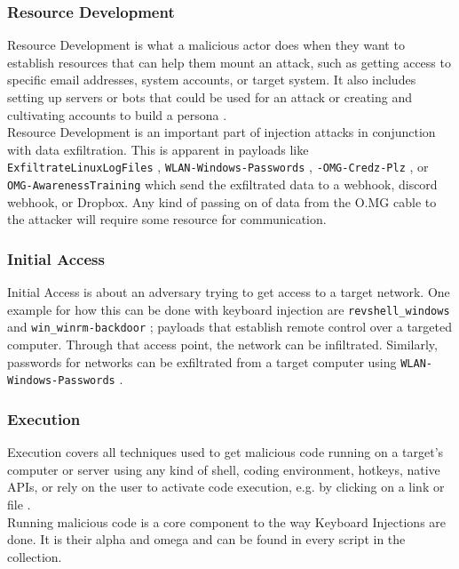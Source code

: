 \subsubsection{Resource Development}

Resource Development is what a malicious actor does when they want to establish resources that can help them mount an attack, such as getting access to specific email addresses, system accounts, or target system. It also includes setting up servers or bots that could be used for an attack or creating and cultivating accounts to build a persona \cite{MITREATTCK}.\\
Resource Development is an important part of injection attacks in conjunction with data exfiltration. This is apparent in payloads like \verb|ExfiltrateLinuxLogFiles| \cite{OmgpayloadsPayloadsLibrary}, \verb|WLAN-Windows-Passwords| \cite{OmgpayloadsPayloadsLibrary}, \verb|-OMG-Credz-Plz| \cite{OmgpayloadsPayloadsLibrary}, or \verb|OMG-AwarenessTraining| \cite{OmgpayloadsPayloadsLibrary} which send the exfiltrated data to a webhook, discord webhook, or Dropbox. Any kind of passing on of data from the O.MG cable to the attacker will require some resource for communication. 


\subsubsection{Initial Access}

Initial Access is about an adversary trying to get access to a target network\cite{MITREATTCK}. One example for how this can be done with keyboard injection are \verb|revshell_windows| and \verb|win_winrm-backdoor| \cite{OmgpayloadsPayloadsLibrary}; payloads that establish remote control over a targeted computer. Through that access point, the network can be infiltrated. Similarly, passwords for networks can be exfiltrated from a target computer using \verb|WLAN-Windows-Passwords| \cite{OmgpayloadsPayloadsLibrary}.\\

\subsubsection{Execution}

Execution covers all techniques used to get malicious code running on a target's computer or server using any kind of shell, coding environment, hotkeys, native APIs, or rely on the user to activate code execution, e.g. by clicking on a link or file \cite{MITREATTCK}.\\
Running malicious code is a core component to the way Keyboard Injections are done. It is their alpha and omega and can be found in every script in the collection.


